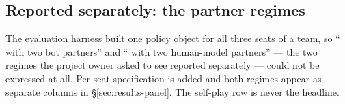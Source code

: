 \subsection{Reported separately: the partner regimes}
\label{sec:mech-exploit}

The evaluation harness built one policy object for all three seats of a team, so ``\vsix{} with two
bot partners'' and ``\vsix{} with two human-model partners'' --- the two regimes the project owner
asked to see reported separately --- could not be expressed at all. Per-seat specification is added
and both regimes appear as separate columns in \S\ref{sec:results-panel}. The self-play row is never
the headline.
